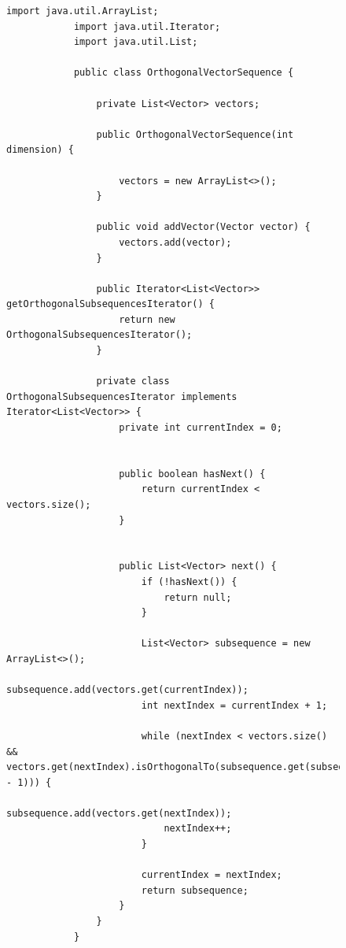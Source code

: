 \documentclass[a4paper, 14pt]{extarticle}
\begin{document}
	\begin{figure}[!htb]
		\begin{lstlisting}[language={},caption={Класс OrthogonalVectorSequence, в котором реализована программа по заданию},label={lst:code1}]
			import java.util.ArrayList;
			import java.util.Iterator;
			import java.util.List;
			
			public class OrthogonalVectorSequence {
				
				private List<Vector> vectors;
				
				public OrthogonalVectorSequence(int dimension) {
					
					vectors = new ArrayList<>();
				}
				
				public void addVector(Vector vector) {
					vectors.add(vector);
				}
				
				public Iterator<List<Vector>> getOrthogonalSubsequencesIterator() {
					return new OrthogonalSubsequencesIterator();
				}
				
				private class OrthogonalSubsequencesIterator implements Iterator<List<Vector>> {
					private int currentIndex = 0;
					
					
					public boolean hasNext() {
						return currentIndex < vectors.size();
					}
					
					
					public List<Vector> next() {
						if (!hasNext()) {
							return null;
						}
						
						List<Vector> subsequence = new ArrayList<>();
						subsequence.add(vectors.get(currentIndex));
						int nextIndex = currentIndex + 1;
						
						while (nextIndex < vectors.size() && vectors.get(nextIndex).isOrthogonalTo(subsequence.get(subsequence.size() - 1))) {
							subsequence.add(vectors.get(nextIndex));
							nextIndex++;
						}
						
						currentIndex = nextIndex;
						return subsequence;
					}
				}
			}
		\end{lstlisting}
	\end{figure}
	
	\newpage
	
\end{document}
